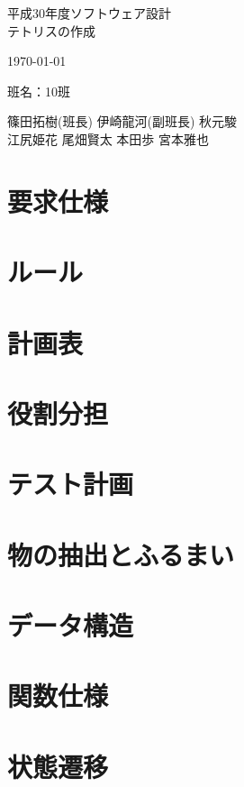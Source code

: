 \documentclass[11pt,a4paper]{jsarticle}
\begin{document}
  \begin{center}
    {\Large 平成30年度ソフトウェア設計\\ テトリスの作成}\par
    \vspace{15mm}
    {\today}\par
    \vspace{100mm}
    {\large 班名：10班}\par
    {\large 篠田拓樹(班長) 伊崎龍河(副班長) 秋元駿\\ 
    江尻姫花 尾畑賢太 本田歩 宮本雅也}
  \end{center}
  \thispagestyle{empty}
  \clearpage
  \addtocounter{page}{-1}
  \tableofcontents
  \clearpage
  \section{要求仕様}
    
  \section{ルール}
    
  \clearpage
  \section{計画表}
    
  \section{役割分担}
    
  \clearpage
  \section{テスト計画}
    
  \clearpage
  \section{物の抽出とふるまい}
    
  \section{データ構造}
    
  \clearpage
  \section{関数仕様}
    
  \clearpage
  \section{状態遷移}
    
  \clearpage
\end{document}

